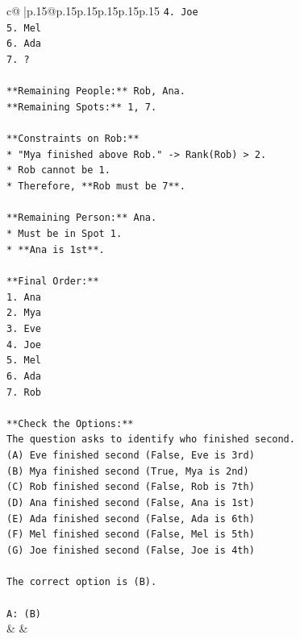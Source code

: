 \documentclass{article}
\begin{document}
{\begin{supertabular}{c@{$\;$}|p{.15\linewidth}@{}p{.15\linewidth}p{.15\linewidth}p{.15\linewidth}p{.15\linewidth}p{.15\linewidth}}
{{{\texttt{4.  Joe} \\
\texttt{5.  Mel} \\
\texttt{6.  Ada} \\
\texttt{7.  ?} \\
\\ 
\texttt{**Remaining People:** Rob, Ana.} \\
\texttt{**Remaining Spots:** 1, 7.} \\
\\ 
\texttt{**Constraints on Rob:**} \\
\texttt{*   "Mya finished above Rob." {-}> Rank(Rob) > 2.} \\
\texttt{*   Rob cannot be 1.} \\
\texttt{*   Therefore, **Rob must be 7**.} \\
\\ 
\texttt{**Remaining Person:** Ana.} \\
\texttt{*   Must be in Spot 1.} \\
\texttt{*   **Ana is 1st**.} \\
\\ 
\texttt{**Final Order:**} \\
\texttt{1.  Ana} \\
\texttt{2.  Mya} \\
\texttt{3.  Eve} \\
\texttt{4.  Joe} \\
\texttt{5.  Mel} \\
\texttt{6.  Ada} \\
\texttt{7.  Rob} \\
\\ 
\texttt{**Check the Options:**} \\
\texttt{The question asks to identify who finished second.} \\
\texttt{(A) Eve finished second (False, Eve is 3rd)} \\
\texttt{(B) Mya finished second (True, Mya is 2nd)} \\
\texttt{(C) Rob finished second (False, Rob is 7th)} \\
\texttt{(D) Ana finished second (False, Ana is 1st)} \\
\texttt{(E) Ada finished second (False, Ada is 6th)} \\
\texttt{(F) Mel finished second (False, Mel is 5th)} \\
\texttt{(G) Joe finished second (False, Joe is 4th)} \\
\\ 
\texttt{The correct option is (B).} \\
\\ 
\texttt{A: (B)} \\
            }
        }
    }
    & & \\ \\


\end{supertabular}}
\end{document}

